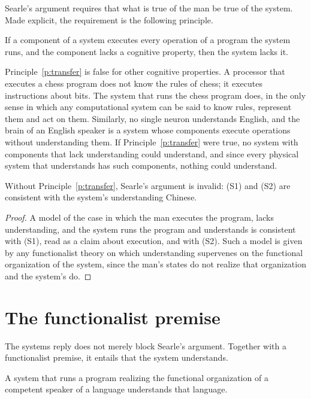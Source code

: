 \documentclass{situationist-preprint}
\begin{document}
Searle's argument requires that what is true of the man be true of the system. Made explicit, the requirement is the following principle.

\begin{principle}\label{p:transfer}
If a component of a system executes every operation of a program the system runs, and the component lacks a cognitive property, then the system lacks it.
\end{principle}

Principle~\ref{p:transfer} is false for other cognitive properties. A processor that executes a chess program does not know the rules of chess; it executes instructions about bits. The system that runs the chess program does, in the only sense in which any computational system can be said to know rules, represent them and act on them. Similarly, no single neuron understands English, and the brain of an English speaker is a system whose components execute operations without understanding them. If Principle~\ref{p:transfer} were true, no system with components that lack understanding could understand, and since every physical system that understands has such components, nothing could understand.

\begin{proposition}\label{p:invalid}
Without Principle~\ref{p:transfer}, Searle's argument is invalid: (S1) and (S2) are consistent with the system's understanding Chinese.
\end{proposition}

\begin{proof}
A model of the case in which the man executes the program, lacks understanding, and the system runs the program and understands is consistent with (S1), read as a claim about execution, and with (S2). Such a model is given by any functionalist theory on which understanding supervenes on the functional organization of the system, since the man's states do not realize that organization and the system's do.
\end{proof}

\section{The functionalist premise}

The systems reply does not merely block Searle's argument. Together with a functionalist premise, it entails that the system understands.

\begin{assumption}\label{a:func}
A system that runs a program realizing the functional organization of a competent speaker of a language understands that language.
\end{assumption}
\end{document}
